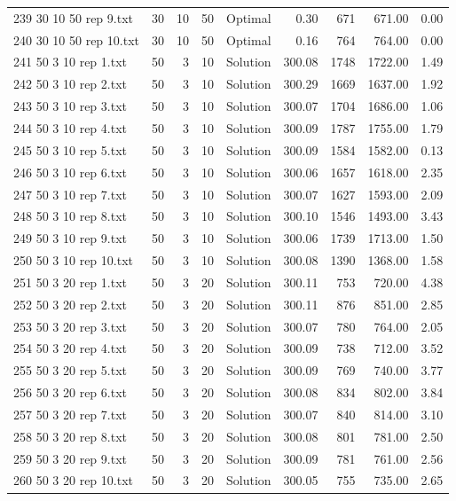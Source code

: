 \begin{longtable}{lrrllrrrr}
239 30 10 50 rep 9.txt & 30 & 10 & 50 & Optimal &  0.30 & 671 & 671.00 &  0.00\\
240 30 10 50 rep 10.txt & 30 & 10 & 50 & Optimal &  0.16 & 764 & 764.00 &  0.00\\
241 50 3 10 rep 1.txt & 50 & 3 & 10 & Solution & 300.08 & 1748 & 1722.00 &  1.49\\
242 50 3 10 rep 2.txt & 50 & 3 & 10 & Solution & 300.29 & 1669 & 1637.00 &  1.92\\
243 50 3 10 rep 3.txt & 50 & 3 & 10 & Solution & 300.07 & 1704 & 1686.00 &  1.06\\
244 50 3 10 rep 4.txt & 50 & 3 & 10 & Solution & 300.09 & 1787 & 1755.00 &  1.79\\
245 50 3 10 rep 5.txt & 50 & 3 & 10 & Solution & 300.09 & 1584 & 1582.00 &  0.13\\
246 50 3 10 rep 6.txt & 50 & 3 & 10 & Solution & 300.06 & 1657 & 1618.00 &  2.35\\
247 50 3 10 rep 7.txt & 50 & 3 & 10 & Solution & 300.07 & 1627 & 1593.00 &  2.09\\
248 50 3 10 rep 8.txt & 50 & 3 & 10 & Solution & 300.10 & 1546 & 1493.00 &  3.43\\
249 50 3 10 rep 9.txt & 50 & 3 & 10 & Solution & 300.06 & 1739 & 1713.00 &  1.50\\
250 50 3 10 rep 10.txt & 50 & 3 & 10 & Solution & 300.08 & 1390 & 1368.00 &  1.58\\
251 50 3 20 rep 1.txt & 50 & 3 & 20 & Solution & 300.11 & 753 & 720.00 &  4.38\\
252 50 3 20 rep 2.txt & 50 & 3 & 20 & Solution & 300.11 & 876 & 851.00 &  2.85\\
253 50 3 20 rep 3.txt & 50 & 3 & 20 & Solution & 300.07 & 780 & 764.00 &  2.05\\
254 50 3 20 rep 4.txt & 50 & 3 & 20 & Solution & 300.09 & 738 & 712.00 &  3.52\\
255 50 3 20 rep 5.txt & 50 & 3 & 20 & Solution & 300.09 & 769 & 740.00 &  3.77\\
256 50 3 20 rep 6.txt & 50 & 3 & 20 & Solution & 300.08 & 834 & 802.00 &  3.84\\
257 50 3 20 rep 7.txt & 50 & 3 & 20 & Solution & 300.07 & 840 & 814.00 &  3.10\\
258 50 3 20 rep 8.txt & 50 & 3 & 20 & Solution & 300.08 & 801 & 781.00 &  2.50\\
259 50 3 20 rep 9.txt & 50 & 3 & 20 & Solution & 300.09 & 781 & 761.00 &  2.56\\
260 50 3 20 rep 10.txt & 50 & 3 & 20 & Solution & 300.05 & 755 & 735.00 &  2.65\\

\end{longtable}
